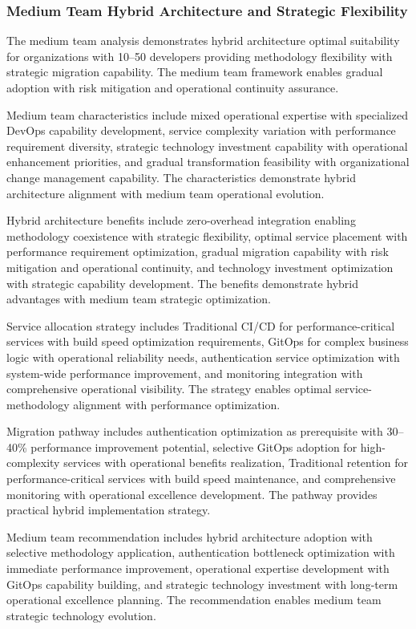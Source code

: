 \subsubsection{Medium Team Hybrid Architecture and Strategic Flexibility}

The medium team analysis demonstrates hybrid architecture optimal suitability for organizations with 10--50 developers providing methodology flexibility with strategic migration capability. The medium team framework enables gradual adoption with risk mitigation and operational continuity assurance.

Medium team characteristics include mixed operational expertise with specialized DevOps capability development, service complexity variation with performance requirement diversity, strategic technology investment capability with operational enhancement priorities, and gradual transformation feasibility with organizational change management capability. The characteristics demonstrate hybrid architecture alignment with medium team operational evolution.

Hybrid architecture benefits include zero-overhead integration enabling methodology coexistence with strategic flexibility, optimal service placement with performance requirement optimization, gradual migration capability with risk mitigation and operational continuity, and technology investment optimization with strategic capability development. The benefits demonstrate hybrid advantages with medium team strategic optimization.

Service allocation strategy includes Traditional CI/CD for performance-critical services with build speed optimization requirements, GitOps for complex business logic with operational reliability needs, authentication service optimization with system-wide performance improvement, and monitoring integration with comprehensive operational visibility. The strategy enables optimal service-methodology alignment with performance optimization.

Migration pathway includes authentication optimization as prerequisite with 30--40\% performance improvement potential, selective GitOps adoption for high-complexity services with operational benefits realization, Traditional retention for performance-critical services with build speed maintenance, and comprehensive monitoring with operational excellence development. The pathway provides practical hybrid implementation strategy.

Medium team recommendation includes hybrid architecture adoption with selective methodology application, authentication bottleneck optimization with immediate performance improvement, operational expertise development with GitOps capability building, and strategic technology investment with long-term operational excellence planning. The recommendation enables medium team strategic technology evolution.

